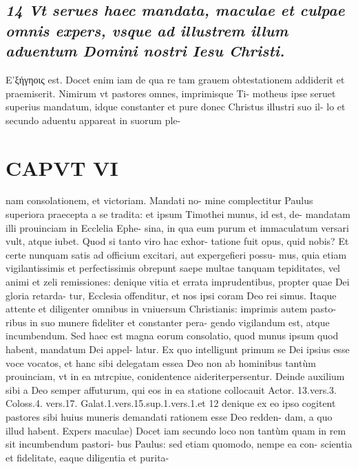 \documentclass{article}
\begin{document}
\begin{pages}
\subsection*{\textit{14 Vt serues haec mandata, maculae et culpae omnis expers, vsque ad illustrem illum aduentum Domini nostri Iesu Christi. }}\pstart Ε’ξήγηοις est. Docet enim iam de qua re tam grauem obtestationem addiderit et praemiserit. Nimirum vt pastores omnes, imprimisque Ti- motheus ipse seruet superius mandatum, idque constanter et pure donec Christus illustri suo il- lo et secundo aduentu appareat in suorum ple-  \pend
\section*{CAPVT VI }
\marginpar{[ p.475 ]}\pstart nam consolationem, et victoriam. Mandati no- mine complectitur Paulus superiora praecepta a se tradita: et ipsum Timothei munus, id est, de- mandatam illi prouinciam in Ecclelia Ephe- sina, in qua eum purum et immaculatum versari vult, atque iubet. Quod si tanto viro hac exhor- tatione fuit opus, quid nobis? Et certe nunquam satis ad officium excitari, aut expergefieri possu- mus, quia etiam vigilantissimis et perfectissimis obrepunt saepe multae tanquam tepiditates, vel animi et zeli remissiones: denique vitia et errata imprudentibus, propter quae Dei gloria retarda- tur, Ecclesia offenditur, et nos ipsi coram Deo rei simus. Itaque attente et diligenter omnibus in vniuersum Christianis: imprimis autem pasto- ribus in suo munere fideliter et constanter pera- gendo vigilandum est, atque incumbendum.  \pend\pstart Sed haec est magna eorum consolatio, quod munus ipsum quod habent, mandatum Dei appel- latur. Ex quo intelligunt primum se Dei ipsius esse voce vocatos, et hanc sibi delegatam essea Deo non ab hominibus tantùm prouinciam, vt in ea mtrcpiue, conidentence aideriterpersentur. Deinde auxilium sibi a Deo semper affuturum, qui eos in ea statione collocauit Actor. 13.vers.3. Coloss.4. vers.17. Galat.1.vers.15.sup.1.vers.1.et 12 denique ex eo ipso cogitent pastores sibi huius muneris demandati rationem esse Deo redden- dam, a quo illud habent.  \pend\pstart Expers maculae) Docet iam secundo loco non tantùm quam in rem sit incumbendum pastori- bus Paulus: sed etiam quomodo, nempe ea con- scientia et fidelitate, eaque diligentia et purita-  \pend

\end{pages}
\end{document}
